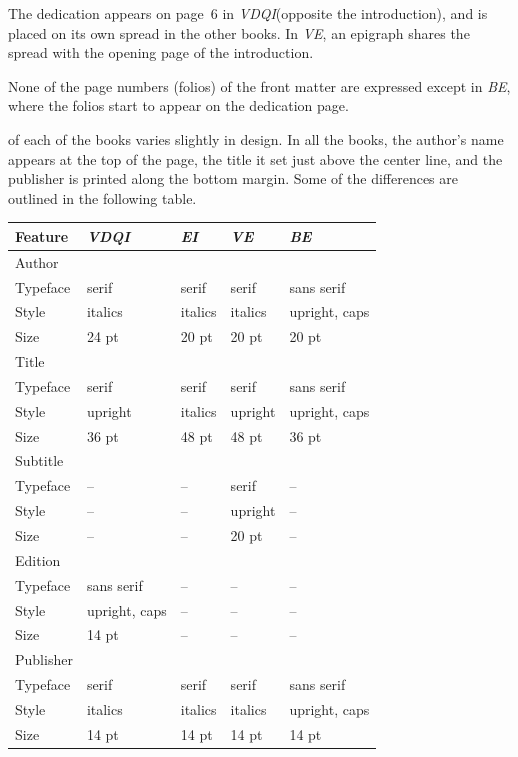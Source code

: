 \documentclass{tufte-book}
\newcommand{\vdqi}{\textit{VDQI}\xspace}
\newcommand{\ei}{\textit{EI}\xspace}
\newcommand{\ve}{\textit{VE}\xspace}
\newcommand{\be}{\textit{BE}\xspace}
\newcommand{\na}{\quad--}%
\begin{document}
The dedication appears on page~6 in \vdqi (opposite the introduction), and
is placed on its own spread in the other books.  In \ve, an epigraph shares
the spread with the opening page of the introduction.

None of the page numbers (folios) of the front matter are expressed except in
\be, where the folios start to appear on the dedication page.

 of each of the books varies slightly in
design.  In all the books, the author's name appears at the top of the
page, the title it set just above the center line, and the publisher is
printed along the bottom margin.  Some of the differences are outlined in
the following table.

\bigskip
\begin{center}
\footnotesize
\begin{tabular}{lllll}
\toprule
Feature & \vdqi & \ei & \ve & \be \\
\midrule
Author & & & & \\
\quad Typeface & serif   & serif   & serif   & sans serif \\
\quad Style    & italics & italics & italics & upright, caps \\
\quad Size     & 24 pt   & 20 pt   & 20 pt   & 20 pt \\
\addlinespace
Title & & & & \\
\quad Typeface & serif   & serif   & serif   & sans serif \\
\quad Style    & upright & italics & upright & upright, caps \\
\quad Size     & 36 pt   & 48 pt   & 48 pt   & 36 pt \\
\addlinespace
Subtitle & & & & \\
\quad Typeface & \na     & \na     & serif   & \na \\
\quad Style    & \na     & \na     & upright & \na \\
\quad Size     & \na     & \na     & 20 pt   & \na \\
\addlinespace
Edition & & & & \\
\quad Typeface & sans serif    & \na  & \na  & \na \\
\quad Style    & upright, caps & \na  & \na  & \na \\
\quad Size     & 14 pt         & \na  & \na  & \na \\
\addlinespace
Publisher & & & & \\
\quad Typeface & serif   & serif   & serif   & sans serif \\
\quad Style    & italics & italics & italics & upright, caps \\
\quad Size     & 14 pt   & 14 pt   & 14 pt   & 14 pt \\
\bottomrule
\end{tabular}
\end{center}
\end{document}
